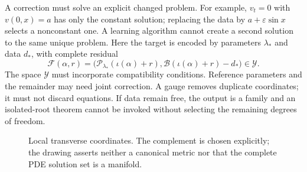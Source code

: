 \documentclass[12pt,a4paper,oneside]{report}
\numberwithin{equation}{chapter}
\theoremstyle{remark}\newtheorem{remark}[theorem]{Remark}
\begin{document}
A correction must solve an explicit changed problem. For example, $v_t=0$ with $v(0,x)=a$ has only the constant solution; replacing the data by $a+\varepsilon\sin x$ selects a nonconstant one. A learning algorithm cannot create a second solution to the same unique problem. Here the target is encoded by parameters $\lambda_*$ and data $d_*$, with complete residual
\[
 \mathcal F(\alpha,r)=\bigl(\mathcal P_{\lambda_*}(\iota(\alpha)+r),
 \mathcal B(\iota(\alpha)+r)-d_*\bigr)\in\mathcal Y.
\]
The space $\mathcal Y$ must incorporate compatibility conditions. Reference parameters and the remainder may need joint correction. A gauge removes duplicate coordinates; it must not discard equations. If data remain free, the output is a family and an isolated-root theorem cannot be invoked without selecting the remaining degrees of freedom.

\begin{figure}[htbp]\centering
{}
\caption[Local transverse coordinates]{Local transverse coordinates. The complement is chosen explicitly; the drawing asserts neither a canonical metric nor that the complete PDE solution set is a manifold.}
\end{figure}
\end{document}
